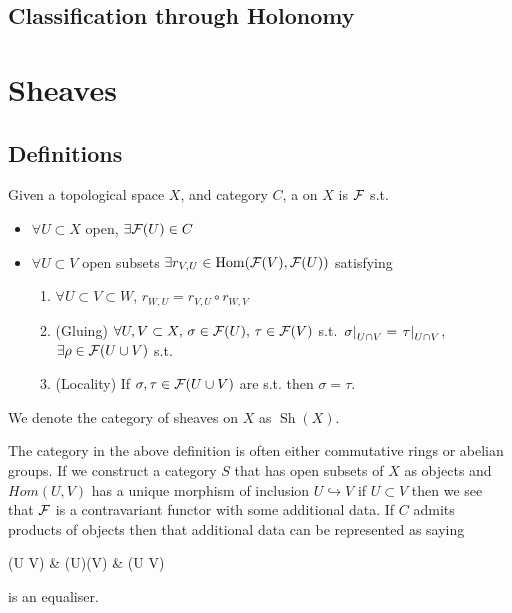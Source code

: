 \documentclass{article}
\begin{document}
\subsection{Classification through Holonomy}

\section{Sheaves}
\subsection{Definitions}

\begin{definition}
	Given a topological space $X$, and category $C$, a  on $X$ is $\mathcal{F}$ s.t. 
	\begin{itemize}
		\item $\forall U \subset X$ open, $\exists \mathcal{F}(U) \in C$
		\item $\forall U \subset V$ open subsets $\exists r_{V,U} \in \operatorname{Hom}(\mathcal{F}(V), \mathcal{F}(U))$ satisfying
		\begin{enumerate}
			\item $\forall U \subset V \subset W$, $r_{W,U} = r_{V,U} \circ r_{W,V}$
			\item (Gluing) $\forall U,V \subset X, \, \sigma \in \mathcal{F}(U), \, \tau \in \mathcal{F}(V)$ s.t. $\left. \sigma \right\rvert_{U \cap V} = \left. \tau \right\rvert_{U \cap V}$, $\exists \rho \in \mathcal{F}(U \cup V)$ s.t. 
			\item (Locality) If $\sigma, \tau \in \mathcal{F}(U \cup V)$ are s.t. 
			then $\sigma = \tau$.
		\end{enumerate}
	\end{itemize}
We denote the category of sheaves on $X$ as $\operatorname{Sh}(X)$. 
\end{definition}

\begin{remark}
	The category in the above definition is often either commutative rings or abelian groups. If we construct a category $S$ that has open subsets of $X$ as objects and $Hom(U,V)$ has a unique morphism of inclusion $U \hookrightarrow V$ if $U \subset V$ then we see that $\mathcal{F}$ is a contravariant functor with some additional data. If $C$ admits products of objects then that additional data can be represented as saying 
	\begin{tkz}
		(U \cup V) \arrow[r] &  (U)\times {}(V)   & (U \cap V) 
	\end{tkz}
	is an equaliser.
\end{remark}
\end{document}
